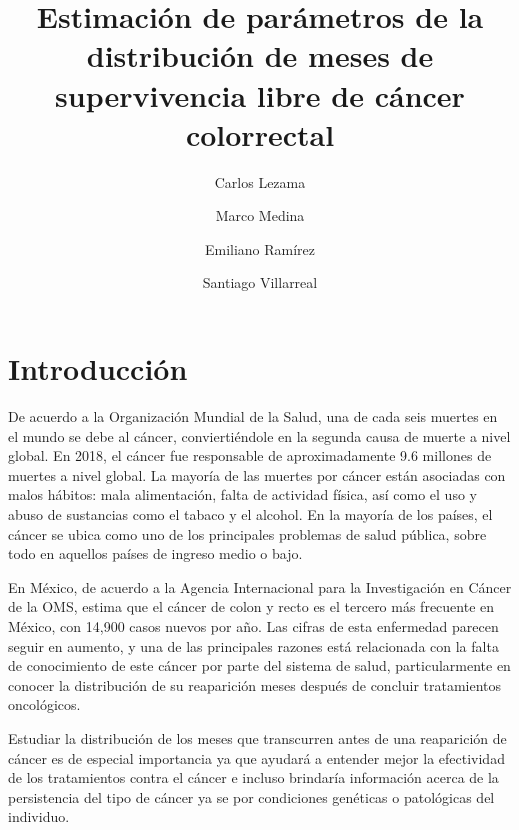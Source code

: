 \documentclass[9pt,twocolumn,twoside,]{pnas-new}
\title{Estimación de parámetros de la distribución de meses de
supervivencia libre de cáncer colorrectal}
\author[a,1,2]{Carlos Lezama}
\author[a,1,2]{Marco Medina}
\author[a,1,2]{Emiliano Ramírez}
\author[a,1,2]{Santiago Villarreal}
\affil[a]{Instituto Tecnológico Autónomo de México}
\begin{document}
\verticaladjustment{-2pt}

\maketitle
\thispagestyle{firststyle}


\acknow{}

\hypertarget{introducciuxf3n}{%
\section*{Introducción}\label{introducciuxf3n}}

De acuerdo a la Organización Mundial de la Salud, una de cada seis
muertes en el mundo se debe al cáncer, conviertiéndole en la segunda
causa de muerte a nivel global. En 2018, el cáncer fue responsable de
aproximadamente 9.6 millones de muertes a nivel global. La mayoría de
las muertes por cáncer están asociadas con malos hábitos: mala
alimentación, falta de actividad física, así como el uso y abuso de
sustancias como el tabaco y el alcohol. En la mayoría de los países, el
cáncer se ubica como uno de los principales problemas de salud pública,
sobre todo en aquellos países de ingreso medio o bajo.

En México, de acuerdo a la Agencia Internacional para la Investigación
en Cáncer de la OMS, estima que el cáncer de colon y recto es el tercero
más frecuente en México, con 14,900 casos nuevos por año. Las cifras de
esta enfermedad parecen seguir en aumento, y una de las principales
razones está relacionada con la falta de conocimiento de este cáncer por
parte del sistema de salud, particularmente en conocer la distribución
de su reaparición meses después de concluir tratamientos oncológicos.

Estudiar la distribución de los meses que transcurren antes de una
reaparición de cáncer es de especial importancia ya que ayudará a
entender mejor la efectividad de los tratamientos contra el cáncer e
incluso brindaría información acerca de la persistencia del tipo de
cáncer ya se por condiciones genéticas o patológicas del individuo.
\end{document}
